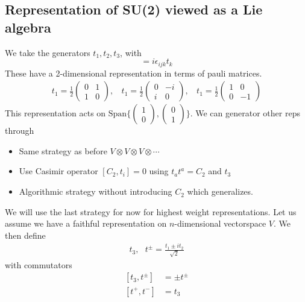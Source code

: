 \documentclass[a4paper,12pt]{article}
\begin{document}
\subsection{Representation of SU(2) viewed as a Lie algebra}
We take the generators $t_1,t_2,t_3$, with
\begin{equation}
[t_i,t_j]=i\epsilon_{ijk}t_k
\end{equation}
These have a 2-dimensional representation in terms of pauli matrices.
\begin{equation}
	\begin{aligned}
		t_1=\frac{1}{2}\begin{pmatrix}
			0 & 1 \\1 & 0
		\end{pmatrix},~~~~		t_1=\frac{1}{2}\begin{pmatrix}
		0 & -i \\i & 0
	\end{pmatrix},~~~~		t_1=\frac{1}{2}\begin{pmatrix}
	1 & 0 \\0 & -1
\end{pmatrix}
	\end{aligned}
\end{equation}
This representation acts on $\text{Span}\{\begin{pmatrix}
	1\\0
\end{pmatrix},\begin{pmatrix}
0\\1
\end{pmatrix}\}$. We can generator other reps through
\begin{itemize}
\item Same strategy as before $V\otimes V\otimes V\otimes \cdots$
\item Use Casimir operator $[C_2,t_i]=0$ using $t_at^a=C_2$ and $t_3$
\item Algorithmic strategy without introducing $C_2$ which generalizes.
\end{itemize}
We will use the last strategy for now for highest weight representations.
Let us assume we have a faithful representation on $n$-dimensional vectorspace $V$. We then define
\begin{equation}
	\begin{aligned}
		t_3,~~~t^\pm=\frac{t_1\pm i t_2}{\sqrt{2}}
	\end{aligned}
\end{equation}
with commutators
\begin{equation}
	\begin{aligned}
[t_3,t^\pm]&=\pm t^\pm\\
	[t^+,t^-]&= t_3
	\end{aligned}
\end{equation}
\end{document}
